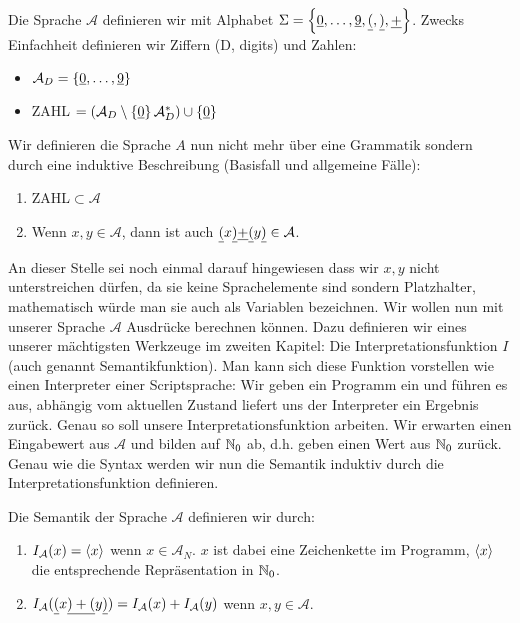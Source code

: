 \begin{defn}
Die Sprache $\mathcal{A}$ definieren wir mit Alphabet $\Sigma=\left\{\underline{0},\ldots,\underline{9},\underline{(},\underline{)},\underline{+}\right\}$.
Zwecks Einfachheit definieren wir Ziffern (D, digits) und Zahlen:
\begin{itemize}
\item $\mathcal{A}_D = \left\{\underline{0},\ldots,\underline{9}\right\}$
\item ZAHL $= (\mathcal{A}_D \setminus \left\{\underline{0}\right\} \mathcal{A}_D^*) \cup \left\{\underline{0}\right\}$
\end{itemize}
Wir definieren die Sprache $A$ nun nicht mehr über eine Grammatik sondern durch eine induktive Beschreibung (Basisfall und allgemeine Fälle):
\begin{enumerate}
\item ZAHL$\subset \mathcal{A}$
\item Wenn $x,y \in \mathcal{A}$, dann ist auch $\underline{(} x \underline{)} \underline{+} \underline{(} y \underline{)} \in \mathcal{A}$.
\end{enumerate}
\end{defn}
An dieser Stelle sei noch einmal darauf hingewiesen dass wir $x,y$ nicht unterstreichen dürfen, da sie keine Sprachelemente sind sondern
Platzhalter, mathematisch würde man sie auch als Variablen bezeichnen.
Wir wollen nun mit unserer Sprache $\mathcal{A}$ Ausdrücke berechnen können.
Dazu definieren wir eines unserer mächtigsten Werkzeuge im zweiten Kapitel:
Die Interpretationsfunktion $I$ (auch genannt Semantikfunktion).
Man kann sich diese Funktion vorstellen wie einen Interpreter einer Scriptsprache:
Wir geben ein Programm ein und führen es aus, abhängig vom aktuellen Zustand liefert
uns der Interpreter ein Ergebnis zurück.
Genau so soll unsere Interpretationsfunktion arbeiten.
Wir erwarten einen Eingabewert aus $\mathcal{A}$ und bilden auf $\mathbb{N}_0$ ab, d.h. geben
einen Wert aus $\mathbb{N}_0$ zurück.
Genau wie die Syntax werden wir nun die Semantik induktiv durch die Interpretationsfunktion definieren.
\begin{defn}
Die Semantik der Sprache $\mathcal{A}$ definieren wir durch:
\begin{enumerate}
\item $I_{\mathcal{A}}(x) = \left<x\right>$ wenn $x \in \mathcal{A}_N$. $x$ ist dabei eine Zeichenkette im Programm, $\left<x\right>$ die
entsprechende Repräsentation in $\mathbb{N}_0$.
\item $I_{\mathcal{A}}(\underline{(}x\underline{)+(}y\underline{)})=I_{\mathcal{A}}(x) + I_{\mathcal{A}}(y)$ wenn $x,y \in \mathcal{A}$.
\end{enumerate}
\end{defn}
